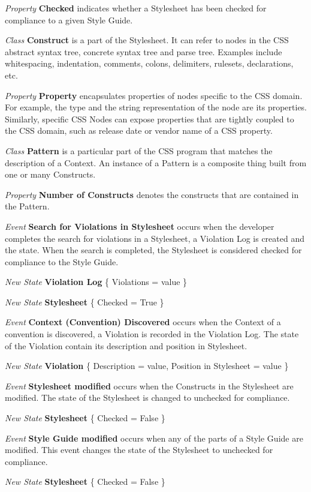 \begin{description}
\textit{Property} \textbf{Checked} indicates whether a Stylesheet has been checked for compliance to a given Style Guide. 


\item\textit{Class} \textbf{Construct} is a part of the Stylesheet. It can refer to nodes in the CSS abstract syntax tree, concrete syntax tree and parse tree. Examples include whitespacing, indentation, comments, colons, delimiters, rulesets, declarations, etc.

\textit{Property} \textbf{Property} encapsulates properties of nodes specific to the CSS domain. For example, the type and the string representation of the node are its properties. Similarly, specific CSS Nodes can expose properties that are tightly coupled to the CSS domain, such as release date or vendor name of a CSS property.


\item\textit{Class} \textbf{Pattern} is a particular part of the CSS program that matches the description of a Context. An instance of a Pattern is a composite thing built from one or many Constructs.

\textit{Property} \textbf{Number of Constructs} denotes the constructs that are contained in the Pattern.


\item\textit{Event} \textbf{Search for Violations in Stylesheet} occurs when the developer completes the search for violations in a Stylesheet, a Violation Log is created and the state. When the search is completed, the Stylesheet is considered checked for compliance to the Style Guide.

\textit{New State} \textbf{Violation Log} \{ Violations = value \}

\textit{New State} \textbf{Stylesheet} \{ Checked = True \}


\item\textit{Event} \textbf{Context (Convention) Discovered} occurs when the Context of a convention is discovered, a Violation is recorded in the Violation Log. The state of the Violation contain its description and position in Stylesheet.

\textit{New State} \textbf{Violation} \{ Description = value, Position in Stylesheet = value \}


\item\textit{Event} \textbf{Stylesheet modified} occurs when the Constructs in the Stylesheet are modified. The state of the Stylesheet is changed to unchecked for compliance.

\textit{New State} \textbf{Stylesheet} \{ Checked = False \}


\item\textit{Event} \textbf{Style Guide modified} occurs when any of the parts of a Style Guide are modified. This event changes the state of the Stylesheet to unchecked for compliance.

\textit{New State} \textbf{Stylesheet} \{ Checked = False \}

\end{description}


